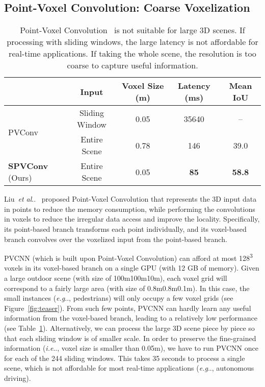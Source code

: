 \documentclass[runningheads]{llncs}
\makeatletter
\newcommand{\fig}[1]{Figure~\ref{#1}}
\newcommand{\tab}[1]{Table~\ref{#1}}
\DeclareRobustCommand\onedot{\futurelet\@let@token\@onedot}
\def\@onedot{\ifx\@let@token.\else.\null\fi\xspace}
\def\eg{\emph{e.g}\onedot} \def\Eg{\emph{E.g}\onedot}
\def\ie{\emph{i.e}\onedot} \def\Ie{\emph{I.e}\onedot}
\def\etal{\emph{et al}\onedot}
\def\moduleshort{SPVConv\xspace}
\makeatother
\begin{document}
\subsection{Point-Voxel Convolution: Coarse Voxelization}

\begin{table}[t]
\setlength{\tabcolsep}{5.5pt}
\small\centering
\begin{tabular}{lcccc}
    \toprule
    & Input & Voxel Size (m) & Latency (ms) & Mean IoU \\
    \midrule
    \multirow{2}{*}{PVConv~\cite{liu2019point}} & Sliding Window & 0.05 & 35640 & -- \\
     & Entire Scene & 0.78 & 146 & 39.0 \\
    \midrule
    \textbf{\moduleshort} (Ours) & Entire Scene & 0.05 & \textbf{85} & \textbf{58.8} \\
    \bottomrule
\end{tabular}
\caption{Point-Voxel Convolution~\cite{liu2019point} is not suitable for large 3D scenes. If processing with sliding windows, the large latency is not affordable for real-time applications. If taking the whole scene, the resolution is too coarse to capture useful information.}
\label{tab:limitation}
\end{table} 
Liu~\etal~\cite{liu2019point} proposed Point-Voxel Convolution that represents the 3D input data in points to reduce the memory consumption, while performing the convolutions in voxels to reduce the irregular data access and improve the locality. Specifically, its point-based branch transforms each point individually, and its voxel-based branch convolves over the voxelized input from the point-based branch.

PVCNN (which is built upon Point-Voxel Convolution) can afford at most 128\textsuperscript{3} voxels in its voxel-based branch on a single GPU (with 12 GB of memory). Given a large outdoor scene (with size of 100m100m10m), each voxel grid will correspond to a fairly large area (with size of 0.8m0.8m0.1m). In this case, the small instances (\eg, pedestrians) will only occupy a few voxel grids (see \fig{fig:teaser}). From such few points, PVCNN can hardly learn any useful information from the voxel-based branch, leading to a relatively low performance (see \tab{tab:limitation}). Alternatively, we can process the large 3D scene piece by piece so that each sliding window is of smaller scale. In order to preserve the fine-grained information (\ie, voxel size is smaller than 0.05m), we have to run PVCNN once for each of the 244 sliding windows. This takes 35 seconds to process a single scene, which is not affordable for most real-time applications (\eg, autonomous driving).
\end{document}
